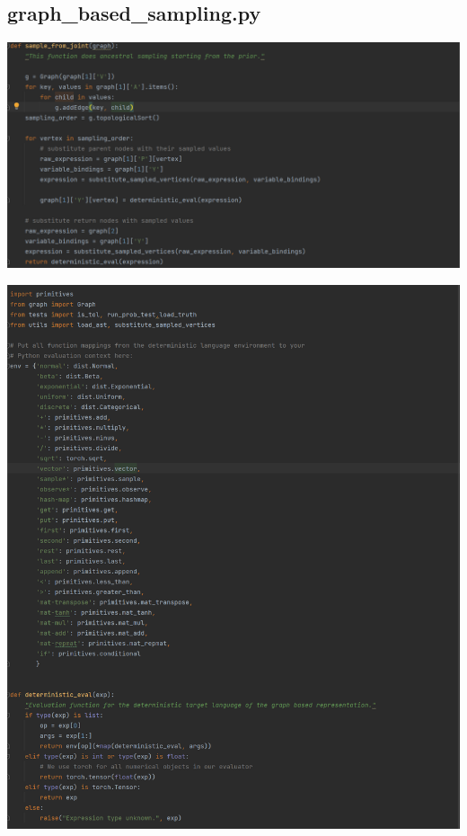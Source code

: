 \documentclass[10pt]{homeworg}
\begin{document}
\subsection{graph\_based\_sampling.py}

\begin{center}
\includegraphics[scale=0.5]{figures/sample_from_joint.png}
\end{center}

\begin{center}
\includegraphics[scale=0.5]{figures/deterministic_eval.png}
\end{center}
\end{document}
